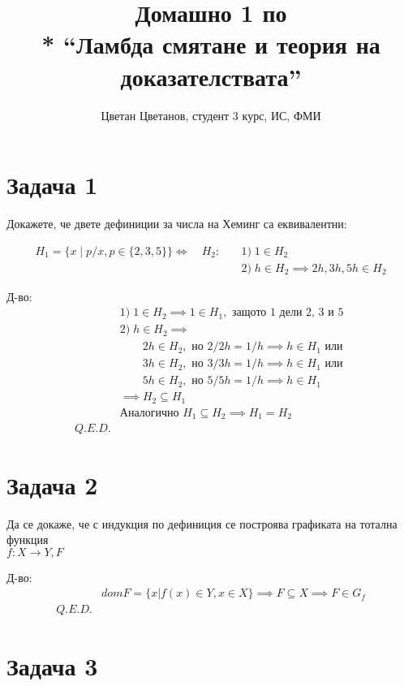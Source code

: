 \documentclass[a4paper]{article}
\title{Домашно 1 по \\* ``Ламбда смятане и теория на доказателствата''}
\author{Цветан Цветанов, студент 3 курс, ИС, ФМИ}
\begin{document}
\maketitle
\thispagestyle{empty}
\newpage

\section*{Задача 1}

Докажете, че двете дефиниции за числа на Хеминг са еквивалентни:

\begin{align*}
H_{1} = \{ x \mid p/x, p \in \{2, 3, 5\}\} \iff \quad H_{2}: \quad & 1)\; 1 \in H_{2} \\
                                                                   & 2)\; h \in H_{2} \implies 2h, 3h, 5h \in H_{2}
\end{align*}

Д-во:
\begin{align*}
& 1)\; 1 \in H_{2} \implies 1 \in H_{1}, \text{ защото 1 дели 2, 3 и 5 } \\
& 2)\; h \in H_{2} \implies \\ 
      & \qquad 2h \in H_{2}, \text{ но } 2/2h = 1/h \implies h \in H_{1} \text{ или} \\
      & \qquad 3h \in H_{2}, \text{ но } 3/3h = 1/h \implies h \in H_{1} \text{ или} \\
      & \qquad 5h \in H_{2}, \text{ но } 5/5h = 1/h \implies h \in H_{1} \\
      & \implies H_{2} \subseteq H_{1} \\
& \text{Аналогично } H_{1} \subseteq H_{2} \implies H_{1} = H_{2} \\
Q.E.D.
\end{align*}

\section*{Задача 2}

Да се докаже, че с индукция по дефиниция се построява графиката на тотална функция \\
$f : X \rightarrow Y, F$

Д-во:
\begin{align*}
& dom F = \{ x | f(x) \in Y, x \in X \} \implies F \subseteq X \implies F \in G_f \\
Q.E.D.
\end{align*}

\section*{Задача 3}
\end{document}
